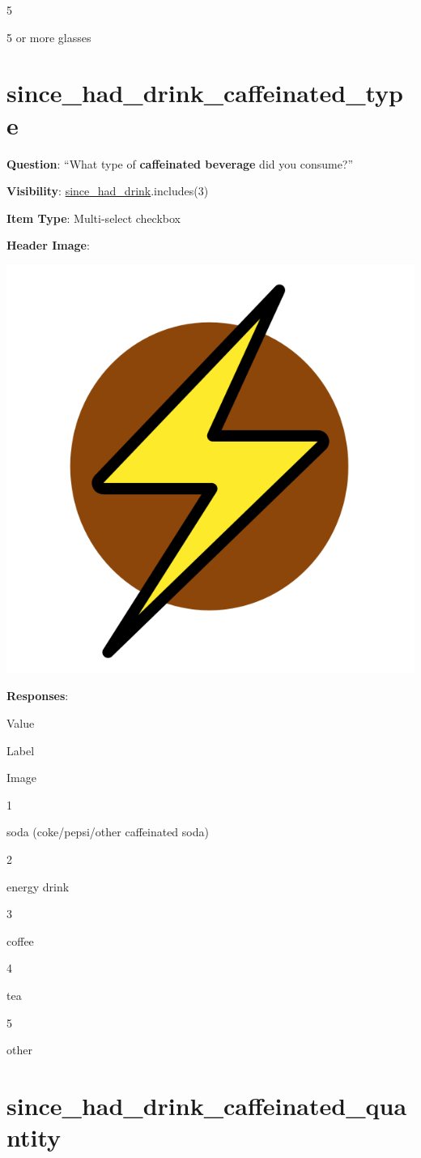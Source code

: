 \documentclass[]{book}
\begin{document}
5

5 or more glasses

\hypertarget{since_had_drink_caffeinated_type}{%
\section{since\_had\_drink\_caffeinated\_type}\label{since_had_drink_caffeinated_type}}

\textbf{Question}: ``What type of \textbf{caffeinated beverage} did you consume?''

\textbf{Visibility}: \protect\hyperlink{since_had_drink}{since\_had\_drink}.includes(3)

\textbf{Item Type}: Multi-select checkbox

\textbf{Header Image}:

\begin{flushleft}\includegraphics[width=0.33\linewidth]{downloadFigs4latex_NIMH_Applet_Codebook/since_had_drink_caffeinated_type_headerImg} \end{flushleft}

\textbf{Responses}:

Value

Label

Image

1

soda (coke/pepsi/other caffeinated soda)

2

energy drink

3

coffee

4

tea

5

other

\hypertarget{since_had_drink_caffeinated_quantity}{%
\section{since\_had\_drink\_caffeinated\_quantity}\label{since_had_drink_caffeinated_quantity}}
\end{document}
